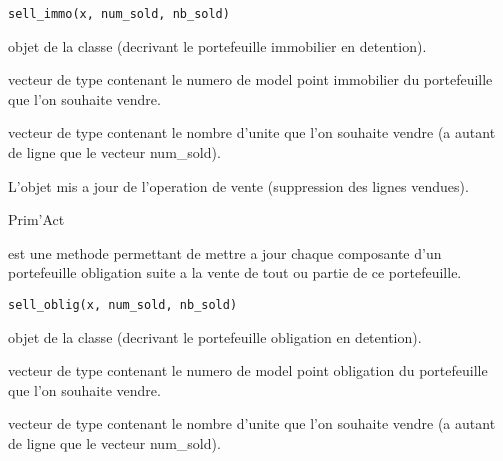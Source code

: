 \documentclass[a4paper]{book}
\begin{document}
%
\begin{Usage}
\begin{verbatim}
sell_immo(x, num_sold, nb_sold)
\end{verbatim}
\end{Usage}
%
\begin{Arguments}
\begin{ldescription}
\item[\code{x}] objet de la classe  (decrivant le portefeuille immobilier en detention).

\item[\code{num\_sold}] vecteur de type  contenant le numero de model point immobilier du portefeuille que l'on souhaite vendre.

\item[\code{nb\_sold}] vecteur de type  contenant le nombre d'unite que l'on souhaite vendre (a autant de ligne que le vecteur num\_sold).
\end{ldescription}
\end{Arguments}
%
\begin{Value}
L'objet  mis a jour de l'operation de vente (suppression des lignes vendues).
\end{Value}
%
\begin{Author}\relax
Prim'Act
\end{Author}
%
\begin{Description}\relax
{} est une methode permettant de mettre a jour chaque composante d'un portefeuille obligation suite a la vente
de tout ou partie de ce portefeuille.
\end{Description}
%
\begin{Usage}
\begin{verbatim}
sell_oblig(x, num_sold, nb_sold)
\end{verbatim}
\end{Usage}
%
\begin{Arguments}
\begin{ldescription}
\item[\code{x}] objet de la classe  (decrivant le portefeuille obligation en detention).

\item[\code{num\_sold}] vecteur de type  contenant le numero de model point obligation du portefeuille que l'on souhaite vendre.

\item[\code{nb\_sold}] vecteur de type  contenant le nombre d'unite que l'on souhaite vendre (a autant de ligne que le vecteur num\_sold).
\end{ldescription}
\end{Arguments}
\end{document}
